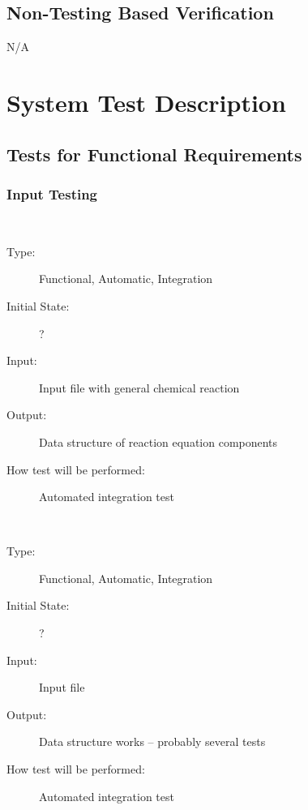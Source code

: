 \documentclass[12pt, titlepage]{article}
\newcounter{testnum} %
\begin{document}
\subsection{Non-Testing Based Verification}
N/A

\section{System Test Description}
\subsection{Tests for Functional Requirements}

\subsubsection{Input Testing}

\\
\begin{addmargin}[2em]{0em}
\begin{description}
\item[Type:] Functional, Automatic, Integration
					
\item[Initial State:] ?
					
\item[Input:] Input file with general chemical reaction
					
\item[Output:] Data structure of reaction equation components
					
\item[How test will be performed:] Automated integration test \\
\end{description}
\end{addmargin}	

\\
\begin{addmargin}[2em]{0em}
\begin{description}
\item[Type:] Functional, Automatic, Integration
					
\item[Initial State:] ?
					
\item[Input:] Input file
					
\item[Output:] Data structure works -- probably several tests
					
\item[How test will be performed:] Automated integration test\\
\end{description}
\end{addmargin}		
\end{document}

